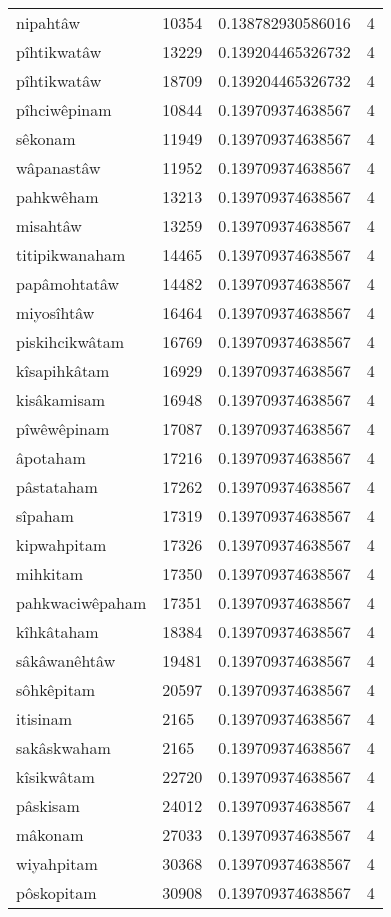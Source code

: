 \begin{longtable}{llll}
nipahtâw & 10354 & 0.138782930586016 & 4 \\
pîhtikwatâw & 13229 & 0.139204465326732 & 4 \\
pîhtikwatâw & 18709 & 0.139204465326732 & 4 \\
pîhciwêpinam & 10844 & 0.139709374638567 & 4 \\
sêkonam & 11949 & 0.139709374638567 & 4 \\
wâpanastâw & 11952 & 0.139709374638567 & 4 \\
pahkwêham & 13213 & 0.139709374638567 & 4 \\
misahtâw & 13259 & 0.139709374638567 & 4 \\
titipikwanaham & 14465 & 0.139709374638567 & 4 \\
papâmohtatâw & 14482 & 0.139709374638567 & 4 \\
miyosîhtâw & 16464 & 0.139709374638567 & 4 \\
piskihcikwâtam & 16769 & 0.139709374638567 & 4 \\
kîsapihkâtam & 16929 & 0.139709374638567 & 4 \\
kisâkamisam & 16948 & 0.139709374638567 & 4 \\
pîwêwêpinam & 17087 & 0.139709374638567 & 4 \\
âpotaham & 17216 & 0.139709374638567 & 4 \\
pâstataham & 17262 & 0.139709374638567 & 4 \\
sîpaham & 17319 & 0.139709374638567 & 4 \\
kipwahpitam & 17326 & 0.139709374638567 & 4 \\
mihkitam & 17350 & 0.139709374638567 & 4 \\
pahkwaciwêpaham & 17351 & 0.139709374638567 & 4 \\
kîhkâtaham & 18384 & 0.139709374638567 & 4 \\
sâkâwanêhtâw & 19481 & 0.139709374638567 & 4 \\
sôhkêpitam & 20597 & 0.139709374638567 & 4 \\
itisinam & 2165 & 0.139709374638567 & 4 \\
sakâskwaham & 2165 & 0.139709374638567 & 4 \\
kîsikwâtam & 22720 & 0.139709374638567 & 4 \\
pâskisam & 24012 & 0.139709374638567 & 4 \\
mâkonam & 27033 & 0.139709374638567 & 4 \\
wiyahpitam & 30368 & 0.139709374638567 & 4 \\
pôskopitam & 30908 & 0.139709374638567 & 4 \\

\end{longtable}
